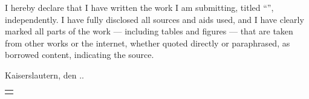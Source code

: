 \documentclass[
	bibliography=totoc, %
	listof=totoc,      %
]{scrbook}              %
\begin{document}
I hereby declare that I have written the work I am submitting, titled \enquote{\thetitle}, independently.
I have fully disclosed all sources and aids used, and I have clearly marked all parts of the work —
including tables and figures — that are taken from other works or the internet, whether quoted directly
or paraphrased, as borrowed content, indicating the source.
\vspace{0.5cm}

Kaiserslautern, den \the\day.\the\month.\the\year

\vspace{2cm}

\begin{tabular}{@{}l@{}}\hline
	\makeatletter\@author\makeatother
\end{tabular}






\cleardoublepage                    %
\tableofcontents                    %


\mainmatter
\listoftodos







\listoffigures





\printbibliography

\end{document}
